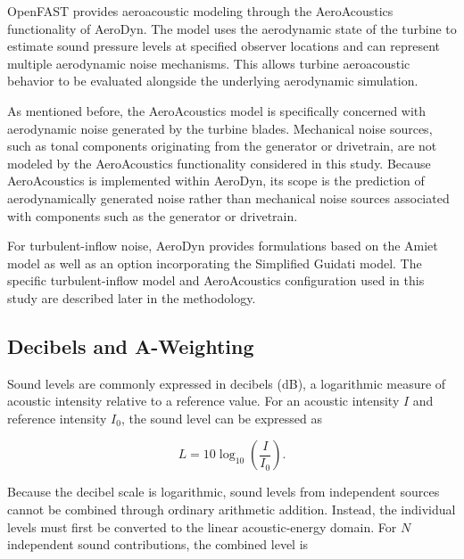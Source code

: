 \documentclass[11pt]{article}
\begin{document}
OpenFAST provides aeroacoustic modeling through the AeroAcoustics functionality of AeroDyn. The model uses the aerodynamic state of the turbine to estimate sound pressure levels at specified observer locations and can represent multiple aerodynamic noise mechanisms. This allows turbine aeroacoustic behavior to be evaluated alongside the underlying aerodynamic simulation.

As mentioned before, the AeroAcoustics model is specifically concerned with aerodynamic noise generated by the turbine blades. Mechanical noise sources, such as tonal components originating from the generator or drivetrain, are not modeled by the AeroAcoustics functionality considered in this study. Because AeroAcoustics is implemented within AeroDyn, its scope is the prediction of aerodynamically generated noise rather than mechanical noise sources associated with components such as the generator or drivetrain.

For turbulent-inflow noise, AeroDyn provides formulations based on the Amiet model as well as an option incorporating the Simplified Guidati model. The specific turbulent-inflow model and AeroAcoustics configuration used in this study are described later in the methodology.


\subsection{Decibels and A-Weighting}
\label{ssec:db_a}

Sound levels are commonly expressed in decibels (dB), a logarithmic measure of acoustic intensity relative to a reference value. For an acoustic intensity $I$ and reference intensity $I_0$, the sound level can be expressed as

\begin{equation}
    L
    =
    10\log_{10}
    \left(
        \frac{I}{I_0}
    \right).
    \label{eq:decibel-definition}
\end{equation}

Because the decibel scale is logarithmic, sound levels from independent sources cannot be combined through ordinary arithmetic addition. Instead, the individual levels must first be converted to the linear acoustic-energy domain. For $N$ independent sound contributions, the combined level is
\end{document}
